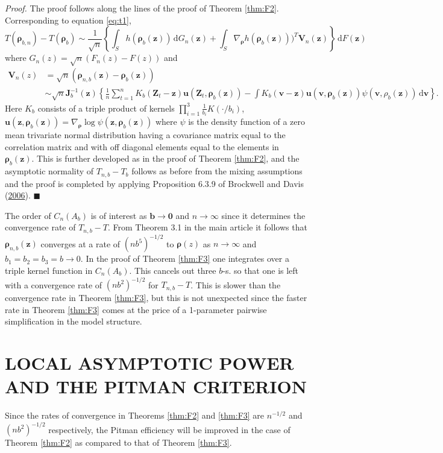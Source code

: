 \documentclass[
  12pt,
  letterpaper]{article}
\numberwithin{equation}{section}
\newcommand{\Z}{\bm{Z}}
\newcommand{\z}{\bm{z}}
\newcommand{\fv}{\bm{v}}
\newcommand{\fu}{\bm{u}}
\newcommand{\fV}{\bm{V}}
\newcommand{\J}{\bm{J}}
\newcommand{\frho}{\bm{\rho}}
\newcommand{\bb}{\bm{b}}
\newcommand{\di}{\,\textrm{d}}
\begin{document}
\emph{Proof.} The proof follows along the lines of the proof of Theorem \ref{thm:F2}. Corresponding to equation \eqref{eq:t1},
\[
T(\frho_{b,n}) - T(\frho_{b}) \sim \frac{1}{\sqrt{n}}\left\{\int_S h(\frho_b(\z)) \di G_n(\z) + \int_S \nabla_{\frho} h(\frho_b(\z)))^T \fV_n(\z)\right\} \di F(\z)
\]
where \(G_n(z) = \sqrt{n}(F_n(z)-F(z))\) and
\begin{align*}
\fV_n(z) &= \sqrt{n} (\frho_{n,b}(\z) - \frho_b(\z)) \\
& \sim \sqrt{n}{\J}_b^{-1}(\z)\left\{\frac{1}{n} \sum_{t=1}^{n}K_b(\Z_t-\z)\fu(\Z_t,\frho_b(\z)) - \int K_b(\fv-\z)\fu(\fv,\frho_b(\z))\psi(\fv,\rho_b(\z)) \di \fv \right\}.
\end{align*}
Here \(K_b\) consists of a triple product of kernels \(\prod_{i=1}^{3}\frac{1}{b_i}K(\cdot/b_i)\), \(\fu(\z,\frho_b(\z)) = \nabla_{\frho}\log \psi(\z,\frho_b(\z))\) where \(\psi\) is the density function of a zero mean trivariate normal distribution having a covariance matrix equal to the correlation matrix and with off diagonal elements equal to the elements in \(\frho_b(\z)\). This is further developed as in the proof of Theorem \ref{thm:F2}, and the asymptotic normality of \(T_{n,b}-T_b\) follows as before from the mixing assumptions and the proof is completed by applying Proposition 6.3.9 of Brockwell and Davis (\protect\hyperlink{ref-brockwell1991time}{2006}). \(\blacksquare\)

The order of \(C_n(A_b)\) is of interest as \(\bb\to \bm{0}\) and \(n \to \infty\) since it determines the convergence rate of \(T_{n,b}-T\). From Theorem 3.1 in the main article it follows that \(\frho_{n,b}(\z)\) converges at a rate of \((nb^5)^{-1/2}\) to \(\frho(z)\) as \(n \to \infty\) and \(b_1=b_2=b_3 = b \to 0\). In the proof of Theorem \ref{thm:F3} one integrates over a triple kernel function in \(C_n(A_b)\). This cancels out three \(b\)-s. so that one is left with a convergence rate of \((nb^2)^{-1/2}\) for \(T_{n,b}-T\). This is slower than the convergence rate in Theorem \ref{thm:F3}, but this is not unexpected since the faster rate in Theorem \ref{thm:F3} comes at the price of a 1-parameter pairwise simplification in the model structure.

\hypertarget{chap:pitman}{%
\section{LOCAL ASYMPTOTIC POWER AND THE PITMAN CRITERION}\label{chap:pitman}}

Since the rates of convergence in Theorems \ref{thm:F2} and \ref{thm:F3} are \(n^{-1/2}\) and \((nb^2)^{-1/2}\) respectively, the Pitman efficiency will be improved in the case of Theorem \ref{thm:F2} as compared to that of Theorem \ref{thm:F3}.
\end{document}
